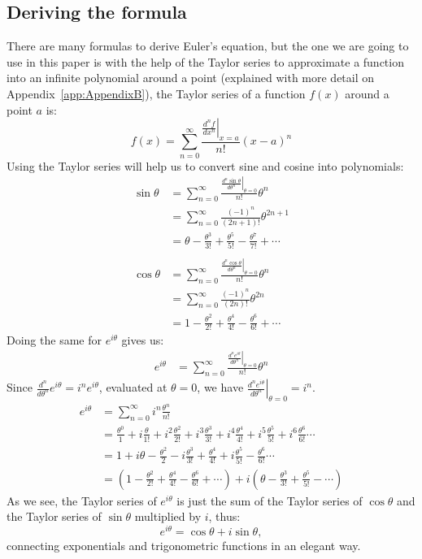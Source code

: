\documentclass[12pt,a4paper]{article}
\begin{document}
\subsection{Deriving the formula}
There are many formulas to derive Euler's equation, but the one we are going to use in this paper is with the help of the Taylor series to approximate a function into an infinite polynomial around a point (explained with more detail on Appendix~\ref{app:AppendixB}), the Taylor series of a function $f(x)$ around a point $a$ is:
\begin{equation}
f(x) = \sum_{n = 0}^\infty \frac{\left.\frac{d^{n}f}{dx^n}\right|_{x=a}}{n!}(x - a)^n
\end{equation}
Using the Taylor series will help us to convert sine and cosine into polynomials:
\begin{align}
\sin{\theta}  &= \sum_{n = 0}^\infty \frac{\left.\frac{d^{n}\sin{\theta}}{d\theta^n}\right|_{\theta=0}}{n!}\theta^n\nonumber\\
&= \sum_{n=0}^\infty \frac{(-1)^n}{(2n + 1)!}\theta^{2n + 1}\\
&= \theta - \frac{\theta^3}{3!} + \frac{\theta^5}{5!} - \frac{\theta^7}{7!} + \cdots\\\nonumber\\
\cos{\theta} &= \sum_{n = 0}^\infty \frac{\left.\frac{d^{n}\cos{\theta}}{d\theta^n}\right|_{\theta=0}}{n!}\theta^n\nonumber\\
&= \sum_{n=0}^\infty \frac{(-1)^n}{(2n)!}\theta^{2n}\\
&= 1 - \frac{\theta^2}{2!} + \frac{\theta^4}{4!} - \frac{\theta^6}{6!} + \cdots
\end{align}
Doing the same for \(e^{i\theta}\) gives us:
\begin{align}
e^{i\theta} &=  \sum_{n = 0}^\infty \frac{\left.\frac{d^n e^{i\theta}}{d\theta^n}\right|_{\theta=0}}{n!}\theta^n\nonumber
\end{align}
Since $\frac{d^n}{d\theta^n}e^{i\theta} = i^ne^{i\theta}$, evaluated at $\theta = 0$, we have $\left.\frac{d^{n}e^{i\theta}}{d\theta^n}\right|_{\theta=0} = i^n$.
\begin{align}
e^{i\theta} &= \sum_{n = 0}^\infty i^n\frac{\theta^n}{n!}\\
&= \frac{\theta^0}{1} + i\frac{\theta}{1!} + i^2\frac{\theta^2}{2!} + i^3\frac{\theta^3}{3!} + i^4\frac{\theta^4}{4!} + i^5\frac{\theta^5}{5!} + i^6\frac{\theta^6}{6!}\cdots\nonumber\\
&=  1 + i\theta - \frac{\theta^2}{2} - i\frac{\theta^3}{3!} + \frac{\theta^4}{4!} + i\frac{\theta^5}{5!} - \frac{\theta^6}{6!}\cdots\nonumber\\
&= \left(1 - \frac{\theta^2}{2!} + \frac{\theta^4}{4!} - \frac{\theta^6}{6!} + \cdots\right) + i\left(\theta - \frac{\theta^3}{3!} + \frac{\theta^5}{5!} - \cdots\right)
\end{align}
As we see, the Taylor series of $e^{i\theta}$ is just the sum of the Taylor series of $\cos{\theta}$ and the Taylor series of $\sin{\theta}$ multiplied by $i$, thus:
\[
e^{i\theta} = \cos{\theta} + i\sin{\theta},
\]
connecting exponentials and trigonometric functions in an elegant way.
\end{document}
